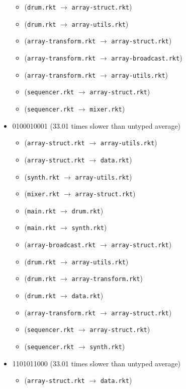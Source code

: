 \documentclass{article}
\newcommand{\mono}[1]{\texttt{#1}}
\begin{document}
\begin{itemize}
\begin{itemize}
  \item (\mono{drum.rkt} $\rightarrow$ \mono{array-struct.rkt})
  \item (\mono{drum.rkt} $\rightarrow$ \mono{array-utils.rkt})
  \item (\mono{array-transform.rkt} $\rightarrow$ \mono{array-struct.rkt})
  \item (\mono{array-transform.rkt} $\rightarrow$ \mono{array-broadcast.rkt})
  \item (\mono{array-transform.rkt} $\rightarrow$ \mono{array-utils.rkt})
  \item (\mono{sequencer.rkt} $\rightarrow$ \mono{array-struct.rkt})
  \item (\mono{sequencer.rkt} $\rightarrow$ \mono{mixer.rkt})
  \end{itemize}
\item 0100010001 (33.01 times slower than untyped average)
  \begin{itemize}
  \item (\mono{array-struct.rkt} $\rightarrow$ \mono{array-utils.rkt})
  \item (\mono{array-struct.rkt} $\rightarrow$ \mono{data.rkt})
  \item (\mono{synth.rkt} $\rightarrow$ \mono{array-utils.rkt})
  \item (\mono{mixer.rkt} $\rightarrow$ \mono{array-struct.rkt})
  \item (\mono{main.rkt} $\rightarrow$ \mono{drum.rkt})
  \item (\mono{main.rkt} $\rightarrow$ \mono{synth.rkt})
  \item (\mono{array-broadcast.rkt} $\rightarrow$ \mono{array-struct.rkt})
  \item (\mono{drum.rkt} $\rightarrow$ \mono{array-utils.rkt})
  \item (\mono{drum.rkt} $\rightarrow$ \mono{array-transform.rkt})
  \item (\mono{drum.rkt} $\rightarrow$ \mono{data.rkt})
  \item (\mono{array-transform.rkt} $\rightarrow$ \mono{array-struct.rkt})
  \item (\mono{sequencer.rkt} $\rightarrow$ \mono{array-struct.rkt})
  \item (\mono{sequencer.rkt} $\rightarrow$ \mono{synth.rkt})
  \end{itemize}
\item 1101011000 (33.01 times slower than untyped average)
  \begin{itemize}
  \item (\mono{array-struct.rkt} $\rightarrow$ \mono{data.rkt})

\end{itemize}
\end{itemize}
\end{document}
